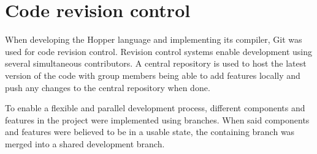 \section{Code revision control}

When developing the Hopper language and implementing its compiler, Git \cite{git} was used for code revision control. Revision control systems enable development using several simultaneous contributors. A central repository is used to host the latest version of the code with group members being able to add features locally and push any changes to the central repository when done.

To enable a flexible and parallel development process, different components and features in the project were implemented using branches. When said components and features were believed to be in a usable state, the containing branch was merged into a shared development branch.
